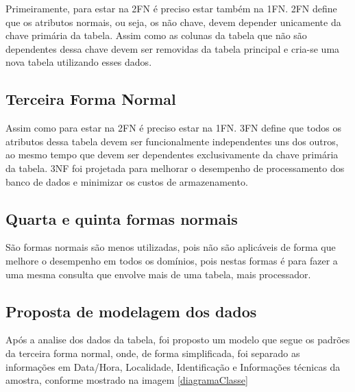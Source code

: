 Primeiramente, para estar na 2FN é preciso estar também na 1FN. 2FN define que os atributos normais, ou seja, os não chave, devem depender unicamente da chave primária da tabela. Assim como as colunas da tabela que não são dependentes dessa chave devem ser removidas da tabela principal e cria-se uma nova tabela utilizando esses dados.

\subsection{Terceira Forma Normal}

Assim como para estar na 2FN é preciso estar na 1FN. 3FN define que todos os atributos dessa tabela devem ser funcionalmente independentes uns dos outros, ao mesmo tempo que devem ser dependentes exclusivamente da chave primária da tabela. 3NF foi projetada para melhorar o desempenho de processamento dos banco de dados e minimizar os custos de armazenamento.

\subsection{Quarta e quinta formas normais}

São formas normais são menos utilizadas, pois não são aplicáveis de forma que melhore o desempenho em todos os domínios, pois nestas formas é para fazer a uma mesma consulta que envolve mais de uma tabela, mais processador.

\subsection{Proposta de modelagem dos dados}

Após a analise dos dados da tabela, foi proposto um modelo que segue os padrões da terceira forma normal, onde, de forma simplificada, foi separado as informações em Data/Hora, Localidade, Identificação e Informações técnicas da amostra, conforme mostrado na imagem \ref{diagramaClasse}

